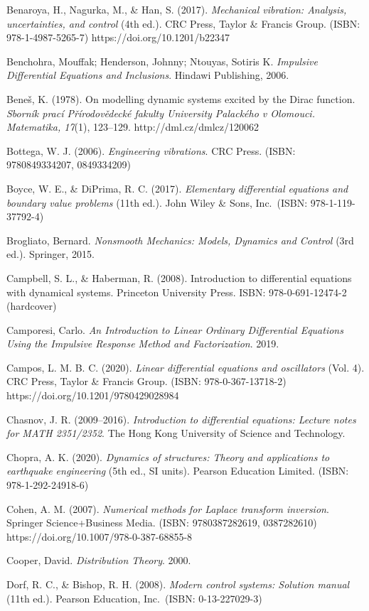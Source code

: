 \documentclass[
  11pt,
]{article}
\begin{document}
Benaroya, H., Nagurka, M., \& Han, S. (2017). \emph{Mechanical
vibration: Analysis, uncertainties, and control} (4th ed.). CRC Press,
Taylor \& Francis Group. (ISBN: 978-1-4987-5265-7)
https://doi.org/10.1201/b22347

Benchohra, Mouffak; Henderson, Johnny; Ntouyas, Sotiris K.
\emph{Impulsive Differential Equations and Inclusions}. Hindawi
Publishing, 2006.

Beneš, K. (1978). On modelling dynamic systems excited by the Dirac
function. \emph{Sborník prací Přírodovědecké fakulty University
Palackého v Olomouci. Matematika, 17}(1), 123--129.
http://dml.cz/dmlcz/120062

Bottega, W. J. (2006). \emph{Engineering vibrations}. CRC Press. (ISBN:
9780849334207, 0849334209)

Boyce, W. E., \& DiPrima, R. C. (2017). \emph{Elementary differential
equations and boundary value problems} (11th ed.). John Wiley \& Sons,
Inc.~(ISBN: 978-1-119-37792-4)

Brogliato, Bernard. \emph{Nonsmooth Mechanics: Models, Dynamics and
Control} (3rd ed.). Springer, 2015.

Campbell, S. L., \& Haberman, R. (2008). Introduction to differential
equations with dynamical systems. Princeton University Press. ISBN:
978-0-691-12474-2 (hardcover)

Camporesi, Carlo. \emph{An Introduction to Linear Ordinary Differential
Equations Using the Impulsive Response Method and Factorization}. 2019.

Campos, L. M. B. C. (2020). \emph{Linear differential equations and
oscillators} (Vol. 4). CRC Press, Taylor \& Francis Group. (ISBN:
978-0-367-13718-2) https://doi.org/10.1201/9780429028984

Chasnov, J. R. (2009--2016). \emph{Introduction to differential
equations: Lecture notes for MATH 2351/2352}. The Hong Kong University
of Science and Technology.

Chopra, A. K. (2020). \emph{Dynamics of structures: Theory and
applications to earthquake engineering} (5th ed., SI units). Pearson
Education Limited. (ISBN: 978-1-292-24918-6)

Cohen, A. M. (2007). \emph{Numerical methods for Laplace transform
inversion}. Springer Science+Business Media. (ISBN: 9780387282619,
0387282610) https://doi.org/10.1007/978-0-387-68855-8

Cooper, David. \emph{Distribution Theory}. 2000.

Dorf, R. C., \& Bishop, R. H. (2008). \emph{Modern control systems:
Solution manual} (11th ed.). Pearson Education, Inc.~(ISBN:
0-13-227029-3)
\end{document}
